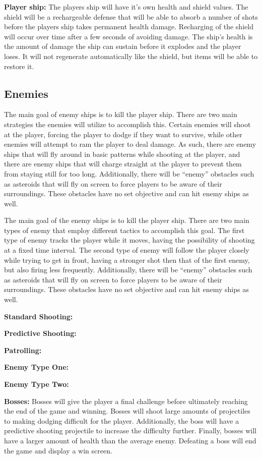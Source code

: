 \documentclass[12pt]{article}       %
\def\hs{\hspace{15pt}}
\begin{document}
	{\bf Player ship:} The players ship will have it’s own health and shield values. The shield will be a rechargeable defense that will be able to absorb a number of shots before the players ship takes permanent health damage. Recharging of the shield will occur over time after a few seconds of avoiding damage. The ship’s health is the amount of damage the ship can sustain before it explodes and the player loses. It will not regenerate automatically like the shield, but items will be able to restore it.

\subsection{Enemies} %

	\hs {\bf Enemies: } The main goal of enemy ships is to kill the player ship. There are two main strategies the enemies will utilize to accomplish this. Certain enemies will shoot at the player, forcing the player to dodge if they want to survive, while other enemies will attempt to ram the player to deal damage. As such, there are enemy ships that will fly around in basic patterns while shooting at the player, and there are enemy ships that will charge straight at the player to prevent them from staying still for too long. Additionally, there will be “enemy” obstacles such as asteroids that will fly on screen to force players to be aware of their surroundings. These obstacles have no set objective and can hit enemy ships as well.

	The main goal of the enemy ships is to kill the player ship. There are two main types of enemy that employ different tactics to accomplish this goal. The first type of enemy tracks the player while it moves, having the possibility of shooting at a fixed time interval. The second type of enemy will follow the player closely while trying to get in front, having a stronger shot then that of the first enemy, but also firing less frequently. Additionally, there will be “enemy” obstacles such as asteroids that will fly on screen to force players to be aware of their surroundings. These obstacles have no set objective and can hit enemy ships as well.

	{\bf Standard Shooting:}

	{\bf Predictive Shooting:} 

	{\bf Patrolling:}

	{\bf Enemy Type One:}

	{\bf Enemy Type Two:}

	{\bf Bosses:} Bosses will give the player a final challenge before ultimately reaching the end of the game and winning. Bosses will shoot large amounts of projectiles to making dodging difficult for the player. Additionally, the boss will have a predictive shooting projectile to increase the difficulty further. Finally, bosses will have a larger amount of health than the average enemy. Defeating a boss will end the game and display a win screen.
\end{document}
